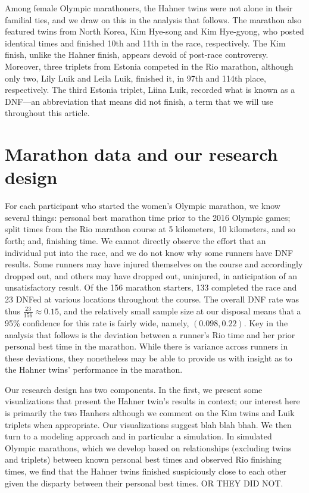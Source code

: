 \documentclass[12pt,titlepage]{article}
\begin{document}
Among female Olympic marathoners, the Hahner twins were not alone in
their familial ties, and we draw on this in the analysis that follows.
The marathon also featured twins from North Korea, Kim Hye-song and
Kim Hye-gyong, who posted identical times and finished 10th and 11th
in the race, respectively. The Kim finish, unlike the Hahner finish,
appears devoid of post-race controversy. Moreover, three triplets from
Estonia competed in the Rio marathon, although only two, Lily Luik and
Leila Luik, finished it, in 97th and 114th place, respectively. The
third Estonia triplet, Liina Luik, recorded what is known as a
DNF---an abbreviation that means did not finish, a term that we will
use throughout this article.

\section*{Marathon data and our research design}

For each participant who started the women's Olympic marathon, we know
several things: personal best marathon time prior to the 2016 Olympic
games; split times from the Rio marathon course at 5 kilometers, 10
kilometers, and so forth; and, finishing time. We cannot directly
observe the effort that an individual put into the race, and we do not
know why some runners have DNF results.  Some runners may have injured
themselves on the course and accordingly dropped out, and others may
have dropped out, uninjured, in anticipation of an unsatisfactory
result. Of the 156 marathon starters, 133 completed the race and 23
DNFed at various locations throughout the course. The overall DNF rate
was thus $\frac{23}{156} \approx 0.15$, and the relatively small
sample size at our disposal means that a 95\% confidence for this rate
is fairly wide, namely, $\left(0.098, 0.22\right)$.  Key in the
analysis that follows is the deviation between a runner's Rio time and
her prior personal best time in the marathon.  While there is variance
across runners in these deviations, they nonetheless may be able to
provide us with insight as to the Hahner twins' performance in the
marathon.

Our research design has two components.  In the first, we present some
visualizations that present the Hahner twin's results in context; our
interest here is primarily the two Hanhers although we comment on the
Kim twins and Luik triplets when appropriate.  Our visualizations
suggest blah blah bhah.  We then turn to a modeling approach and in
particular a simulation.  In simulated Olympic marathons, which we
develop based on relationships (excluding twins and triplets) between
known personal best times and observed Rio finishing times, we find
that the Hahner twins finished suspiciously close to each other given
the disparty between their personal best times.  OR THEY DID NOT.
\end{document}
